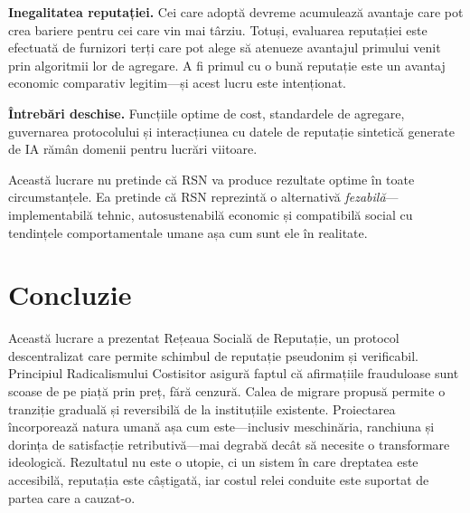 \documentclass[11pt,a4paper,twocolumn]{article}
\begin{document}
\textbf{Inegalitatea reputației.} Cei care adoptă devreme acumulează avantaje care pot crea bariere pentru cei care vin mai târziu. Totuși, evaluarea reputației este efectuată de furnizori terți care pot alege să atenueze avantajul primului venit prin algoritmii lor de agregare. A fi primul cu o bună reputație este un avantaj economic comparativ legitim---și acest lucru este intenționat.

\textbf{Întrebări deschise.} Funcțiile optime de cost, standardele de agregare, guvernarea protocolului și interacțiunea cu datele de reputație sintetică generate de IA rămân domenii pentru lucrări viitoare.

Această lucrare nu pretinde că RSN va produce rezultate optime în toate circumstanțele. Ea pretinde că RSN reprezintă o alternativă \emph{fezabilă}---implementabilă tehnic, autosustenabilă economic și compatibilă social cu tendințele comportamentale umane așa cum sunt ele în realitate.

\section{Concluzie}

Această lucrare a prezentat Rețeaua Socială de Reputație, un protocol descentralizat care permite schimbul de reputație pseudonim și verificabil. Principiul Radicalismului Costisitor asigură faptul că afirmațiile frauduloase sunt scoase de pe piață prin preț, fără cenzură. Calea de migrare propusă permite o tranziție graduală și reversibilă de la instituțiile existente. Proiectarea încorporează natura umană așa cum este---inclusiv meschinăria, ranchiuna și dorința de satisfacție retributivă---mai degrabă decât să necesite o transformare ideologică. Rezultatul nu este o utopie, ci un sistem în care dreptatea este accesibilă, reputația este câștigată, iar costul relei conduite este suportat de partea care a cauzat-o.


\end{document}

